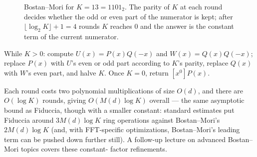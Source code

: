 \documentclass[11pt]{article}
\begin{document}
\begin{figure}[H]
\centering
{}
\caption{Bostan--Mori for $K=13=1101_2$. The parity of $K$ at each round decides whether the odd or even part of the numerator is kept; after $\lfloor\log_2 K\rfloor+1=4$ rounds $K$ reaches $0$ and the answer is the constant term of the current numerator.}\label{fig:kth_halving}
\end{figure}

\begin{definitionbox}
While $K>0$: compute $U(x)=P(x)Q(-x)$ and $W(x)=Q(x)Q(-x)$; replace $P(x)$
with $U$'s even or odd part according to $K$'s parity, replace $Q(x)$
with $W$'s even part, and halve $K$. Once $K=0$, return $[x^0]P(x)$.
\end{definitionbox}

Each round costs two polynomial multiplications of size $O(d)$, and there
are $O(\log K)$ rounds, giving $O(M(d)\log K)$ overall --- the same
asymptotic bound as Fiduccia, though with a smaller constant: standard
estimates put Fiduccia around $3M(d)\log K$ ring operations against
Bostan--Mori's $2M(d)\log K$ (and, with FFT-specific optimizations,
Bostan--Mori's leading term can be pushed down further still). A
follow-up lecture on advanced Bostan--Mori topics covers these constant-
factor refinements.
\end{document}
